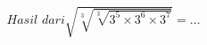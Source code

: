 \documentclass[preview]{standalone}
\begin{document}
\begin{align*}
Hasil \,\, dari \displaystyle \sqrt{\sqrt[3]{\sqrt[3]{3^5 \times 3^6 \times 3^7}}} =\dots
\end{align*}
\end{document}
